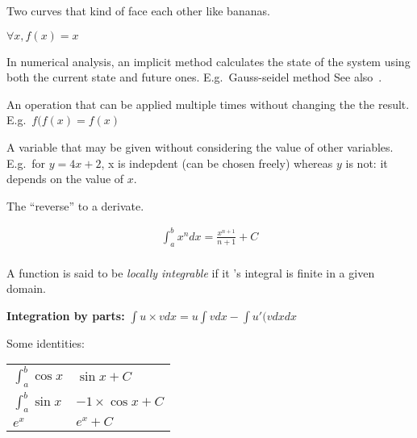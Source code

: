 \begin{definition}[Hyperbolic]
    Two curves that kind of face each other like bananas.
\end{definition}

\begin{definition}
    $\forall{x}, f(x) = x$
\end{definition}

\begin{definition}\label{implicitmethod}
    In numerical analysis, an implicit method calculates the state of the system
    using both the current state and future ones. E.g.\ Gauss-seidel method
    See also~.
\end{definition}

\begin{definition}[Idempotence]
    An operation that can be applied multiple times without changing the
    the result. E.g.\ $f(f(x) = f(x)$
\end{definition}

\begin{definition}
    A variable that may be given without considering the value of other
    variables. E.g.\ for $y = 4x + 2$, x is indepdent (can be chosen freely)
    whereas $y$ is not: it depends on the value of $x$.
\end{definition}

\begin{definition}[Integral]
    The ``reverse'' to a derivate. 

    \begin{align}
        \int_{a}^{b}x^{n} dx = \frac{x^{n+1}}{n+1} + C \\
    \end{align}

    A function is said to be \textit{locally integrable} if it 's integral is 
    finite in a given domain.

    \textbf{Integration by parts:} $\int{u \times v dx} = u\int{v dx} - \int{u\prime{(v dx}}dx $

    Some identities:
    \begin{longtable}{|l|l|}
        $\int_{a}^{b}\cos{x} $ & $\sin{x} + C $ \\
    $\int_{a}^{b}\sin{x}$ & $-1 \times \cos{x} + C $\\
    $e^{x}$ & $e^{x} + C $
    \end{longtable}

\end{definition}


